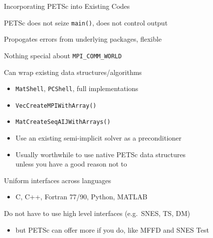 \begin{frame}[fragile]{Incorporating PETSc into Existing Codes}
  \begin{block}{PETSc does not seize \lstinline|main()|, does not control output}   \end{block} \vspace*{-0.4cm}
  \begin{block}{Propogates errors from underlying packages, flexible}   \end{block} \vspace*{-0.4cm}
  \begin{block}{Nothing special about \lstinline|MPI_COMM_WORLD|}   \end{block} \vspace*{-0.4cm}
  \begin{block}{Can wrap existing data structures/algorithms}
    \begin{itemize} \vspace*{-0.2cm}
    \item \lstinline|MatShell|, \lstinline|PCShell|, full implementations
    \item \lstinline|VecCreateMPIWithArray()|
    \item \lstinline|MatCreateSeqAIJWithArrays()|
    \item Use an existing semi-implicit solver as a preconditioner
    \item Usually worthwhile to use native PETSc data structures \\
      unless you have a good reason not to
    \end{itemize}
  \end{block} \vspace*{-0.4cm}
  \begin{block}{Uniform interfaces across languages}
    \begin{itemize} \vspace*{-0.2cm}
    \item C, C++, Fortran 77/90, Python, MATLAB
    \end{itemize}
  \end{block} \vspace*{-0.4cm}
  \begin{block}{Do not have to use high level interfaces (e.g.~SNES, TS, DM)}
    \begin{itemize} \vspace*{-0.2cm}
    \item but PETSc can offer more if you do, like MFFD and SNES Test
    \end{itemize}
  \end{block}
\end{frame}
